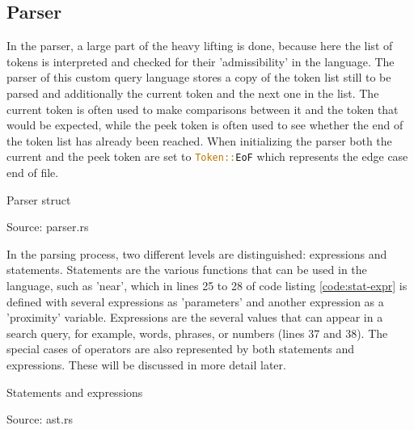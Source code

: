 \subsection{Parser}
In the parser, a large part of the heavy lifting is done, because here the list of tokens is interpreted and checked for their 'admissibility' in the language. The parser of this custom query language stores a copy of the token list still to be parsed and additionally the current token and the next one in the list. The current token is often used to make comparisons between it and the token that would be expected, while the peek token is often used to see whether the end of the token list has already been reached. When initializing the parser both the current and the peek token are set to \lstinline[language=Rust]$Token::EoF$ which represents the edge case end of file.
\begin{mycapcode}[H]
    \caption{Parser struct}
    \label{code:parser-struct}
    
    \centerline{Source: parser.rs}
\end{mycapcode}
In the parsing process, two different levels are distinguished: expressions and statements. Statements are the various functions that can be used in the language, such as 'near', which in lines 25 to 28 of code listing \ref{code:stat-expr} is defined with several expressions as 'parameters' and another expression as a 'proximity' variable. Expressions are the several values that can appear in a search query, for example, words, phrases, or numbers (lines 37 and 38). The special cases of operators are also represented by both statements and expressions. These will be discussed in more detail later.
\begin{mycapcode}[H]
    \caption{Statements and expressions}
    \label{code:stat-expr}
    
    \centerline{Source: ast.rs}
\end{mycapcode}
